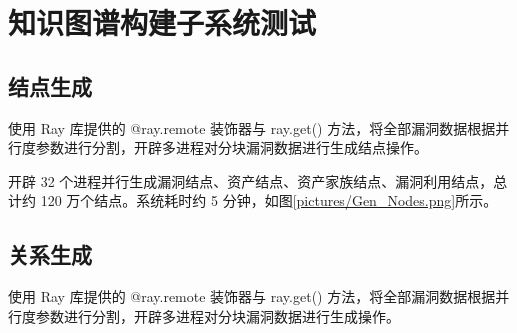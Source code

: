\documentclass[a4paper,AutoFakeBold,oneside,12pt]{book}
\begin{document}


\section{知识图谱构建子系统测试}

\subsection{结点生成}

使用 Ray 库提供的 @ray.remote 装饰器与 ray.get() 方法，将全部漏洞数据根据并行度参数进行分割，开辟多进程对分块漏洞数据进行生成结点操作。

开辟 32 个进程并行生成漏洞结点、资产结点、资产家族结点、漏洞利用结点，总计约 120 万个结点。系统耗时约 5 分钟，如图\ref{pictures/Gen_Nodes.png}所示。



\subsection{关系生成}

使用 Ray 库提供的 @ray.remote 装饰器与 ray.get() 方法，将全部漏洞数据根据并行度参数进行分割，开辟多进程对分块漏洞数据进行生成操作。
\end{document}
